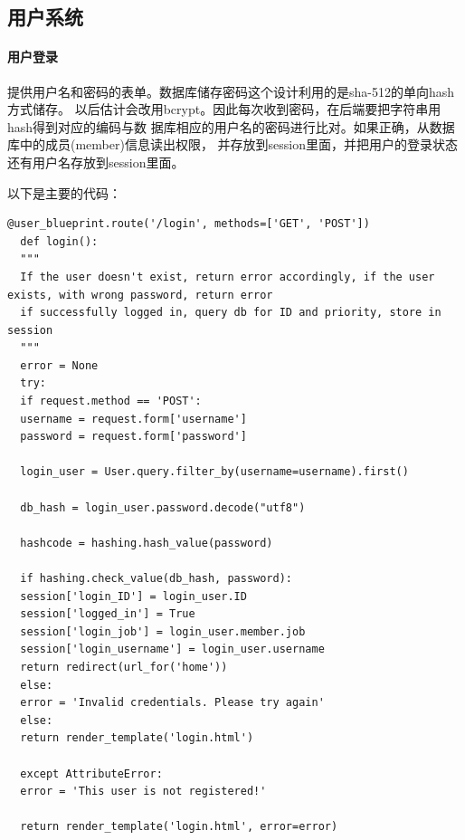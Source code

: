 \subsection{用户系统}
\paragraph{用户登录}
提供用户名和密码的表单。数据库储存密码这个设计利用的是sha-512的单向hash方式储存。
以后估计会改用bcrypt。因此每次收到密码，在后端要把字符串用hash得到对应的编码与数
据库相应的用户名的密码进行比对。如果正确，从数据库中的成员(member)信息读出权限，
并存放到session里面，并把用户的登录状态还有用户名存放到session里面。

\vspace{3em}
以下是主要的代码：
\begin{Verbatim}[]
  @user_blueprint.route('/login', methods=['GET', 'POST'])
  def login():
  """
  If the user doesn't exist, return error accordingly, if the user exists, with wrong password, return error
  if successfully logged in, query db for ID and priority, store in session
  """
  error = None
  try:
  if request.method == 'POST':
  username = request.form['username']
  password = request.form['password']

  login_user = User.query.filter_by(username=username).first()

  db_hash = login_user.password.decode("utf8")

  hashcode = hashing.hash_value(password)

  if hashing.check_value(db_hash, password):
  session['login_ID'] = login_user.ID
  session['logged_in'] = True
  session['login_job'] = login_user.member.job
  session['login_username'] = login_user.username
  return redirect(url_for('home'))
  else:
  error = 'Invalid credentials. Please try again'
  else:
  return render_template('login.html')

  except AttributeError:
  error = 'This user is not registered!'

  return render_template('login.html', error=error)
\end{Verbatim}


